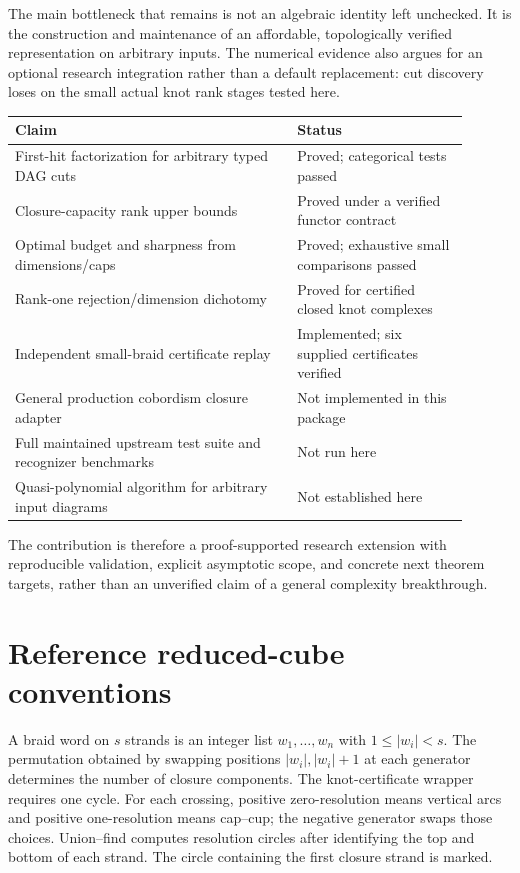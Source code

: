 \documentclass[11pt,letterpaper]{article}
\theoremstyle{definition}\newtheorem{definition}[theorem]{Definition}
\theoremstyle{remark}\newtheorem{remark}[theorem]{Remark}
\begin{document}
The main bottleneck that remains is not an algebraic identity left unchecked.
It is the construction and maintenance of an affordable, topologically
verified representation on arbitrary inputs. The numerical evidence also
argues for an optional research integration rather than a default replacement:
cut discovery loses on the small actual knot rank stages tested here.
\begin{center}
\begin{tabular}{p{0.56\linewidth}p{0.34\linewidth}}
\toprule
Claim & Status\\
\midrule
First-hit factorization for arbitrary typed DAG cuts & Proved; categorical tests passed\\
Closure-capacity rank upper bounds & Proved under a verified functor contract\\
Optimal budget and sharpness from dimensions/caps & Proved; exhaustive small comparisons passed\\
Rank-one rejection/dimension dichotomy & Proved for certified closed knot complexes\\
Independent small-braid certificate replay & Implemented; six supplied certificates verified\\
General production cobordism closure adapter & Not implemented in this package\\
Full maintained upstream test suite and recognizer benchmarks & Not run here\\
Quasi-polynomial algorithm for arbitrary input diagrams & Not established here\\
\bottomrule
\end{tabular}
\end{center}
The contribution is therefore a proof-supported research extension with
reproducible validation, explicit asymptotic scope, and concrete next theorem
targets, rather than an unverified claim of a general complexity breakthrough.

\appendix
\section{Reference reduced-cube conventions}
A braid word on $s$ strands is an integer list $w_1,\ldots,w_n$ with
$1\leq|w_i|<s$. The permutation obtained by swapping positions
$|w_i|,|w_i|+1$ at each generator determines the number of closure components.
The knot-certificate wrapper requires one cycle. For each crossing, positive
zero-resolution means vertical arcs and positive one-resolution means
cap--cup; the negative generator swaps those choices. Union--find computes
resolution circles after identifying the top and bottom of each strand.
The circle containing the first closure strand is marked.
\end{document}
